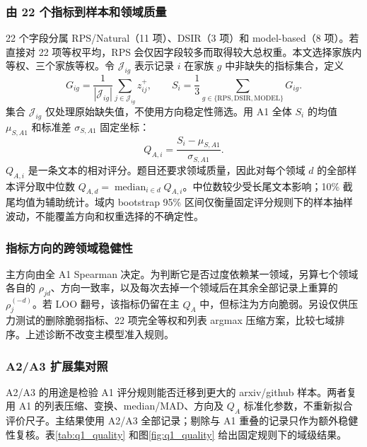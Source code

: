 \subsubsection{由 22 个指标到样本和领域质量}

22 个字段分属 RPS/Natural（11 项）、DSIR（3 项）和 model-based（8 项）。若直接对 22 项等权平均，RPS 会仅因字段较多而取得较大总权重。本文选择家族内等权、三个家族等权。令 $\mathcal J_{ig}$ 表示记录 $i$ 在家族 $g$ 中非缺失的指标集合，定义
\begin{equation}
G_{ig}=\frac{1}{|\mathcal J_{ig}|}\sum_{j\in\mathcal J_{ig}}z^+_{ij},
\qquad S_i=\frac13\sum_{g\in\{\mathrm{RPS,DSIR,MODEL}\}}G_{ig}.
\label{eq:q1_family_score}
\end{equation}
集合 $\mathcal J_{ig}$ 仅处理原始缺失值，不使用方向稳定性筛选。用 A1 全体 $S_i$ 的均值 $\mu_{S,A1}$ 和标准差 $\sigma_{S,A1}$ 固定坐标：
\begin{equation}
Q_{A,i}=\frac{S_i-\mu_{S,A1}}{\sigma_{S,A1}}.
\label{eq:q1_QA}
\end{equation}
$Q_{A,i}$ 是一条文本的相对评分。题目还要求领域质量，因此对每个领域 $d$ 的全部样本评分取中位数 $Q_{A,d}=\operatorname{median}_{i\in d}Q_{A,i}$。中位数较少受长尾文本影响；10\% 截尾均值为辅助统计。域内 bootstrap 95\% 区间仅衡量固定评分规则下的样本抽样波动，不能覆盖方向和权重选择的不确定性。

\subsubsection{指标方向的跨领域稳健性}

主方向由全 A1 Spearman 决定。为判断它是否过度依赖某一领域，另算七个领域各自的 $\rho_{jd}$、方向一致率，以及每次去掉一个领域后在其余全部记录上重算的 $\rho_j^{(-d)}$。若 LOO 翻号，该指标仍留在主 $Q_A$ 中，但标注为方向脆弱。另设仅供压力测试的删除脆弱指标、22 项完全等权和列表 argmax 压缩方案，比较七域排序。上述诊断不改变主模型准入规则。

\subsubsection{A2/A3 扩展集对照}

A2/A3 的用途是检验 A1 评分规则能否迁移到更大的 arxiv/github 样本。两者复用 A1 的列表压缩、变换、median/MAD、方向及 $Q_A$ 标准化参数，不重新拟合评价尺子。主结果使用 A2/A3 全部记录；剔除与 A1 重叠的记录只作为额外稳健性复核。表\ref{tab:q1_quality} 和图\ref{fig:q1_quality} 给出固定规则下的域级结果。

